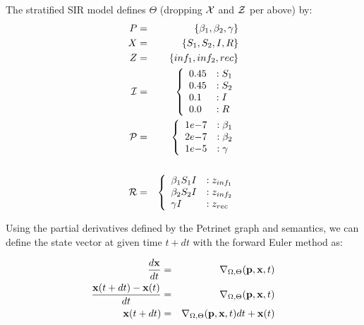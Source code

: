 \begin{example}\label{ex:base}
	The stratified SIR model defines $\Theta$ (dropping ${\cal X}$ and ${\cal
				Z}$ per above) by:
	\begin{eqnarray*}
		P &=& \{\beta_1, \beta_2, \gamma\}\\
		X &=& \{S_1, S_2, I, R\}\\
		Z &=& \{inf_1, inf_2, rec\}\\
		{\cal I} &=& \left\{
		\begin{array}{ll}
			0.45 & :S_1 \\
			0.45 & :S_2 \\
			0.1  & :I   \\
			0.0  & :R
		\end{array}\right.\\
		{\cal P}&=& \left\{
		\begin{array}{ll}
			1e{-7} & :\beta_1 \\
			2e{-7} & :\beta_2 \\
			1e{-5} & :\gamma
		\end{array}\right.\\
		\\
		{\cal R} &=& \left\{
		\begin{array}{ll}
			\beta_1 S_1 I & : z_{inf_1} \\
			\beta_2 S_2 I & : z_{inf_2} \\
			\gamma I      & : z_{rec}   \\
		\end{array}\right.\\
	\end{eqnarray*}
\end{example}


Using the partial derivatives defined by the Petrinet graph and semantics, we
can define the state vector at given time $t+dt$ with the forward Euler method
as:

\begin{eqnarray*}
	\frac{d {\bf x}}{dt} &=& \nabla_{\Omega, \Theta}({\bf p},{\bf x}, t)\\
	\frac{{\bf x}(t+dt)-{\bf x}(t)}{dt} &=& \nabla_{\Omega, \Theta}({\bf p},{\bf x},
	t)\\
	{\bf x}(t+dt)&=& \nabla_{\Omega, \Theta}({\bf p},{\bf x}, t)dt+ {\bf x}(t)
\end{eqnarray*}


